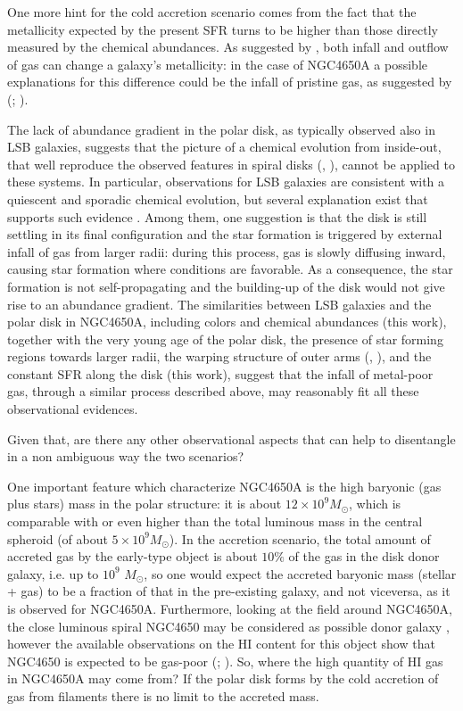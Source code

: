 \documentclass[12pt,preprint]{aastex}
\begin{document}
One more hint for the cold accretion scenario comes from the fact
that the metallicity expected by the present SFR turns to be
higher than those directly measured by the chemical abundances. As
suggested by \citet{Dal07}, both infall and outflow of gas can
change a galaxy's metallicity: in the case of NGC4650A a possible
explanations for this difference could be the infall of pristine
gas, as suggested by (\citealt{Fin07}; \citealt{Ell08}).

The lack of abundance gradient in the polar disk, as typically
observed also in LSB galaxies, suggests that the picture of a chemical
evolution from inside-out, that well reproduce the observed features
in spiral disks (\citealt{Mat89}, \citealt{Boi99}), cannot be applied
to these systems.  In particular, observations for LSB galaxies are
consistent with a quiescent and sporadic chemical evolution, but
several explanation exist that supports such evidence
\citep{deB98}. Among them, one suggestion is that the disk is still
settling in its final configuration and the star formation is
triggered by external infall of gas from larger radii: during this
process, gas is slowly diffusing inward, causing star formation where
conditions are favorable. As a consequence, the star formation is not
self-propagating and the building-up of the disk would not give rise
to an abundance gradient. The similarities between LSB galaxies and
the polar disk in NGC4650A, including colors \citep{Iod02} and
chemical abundances (this work), together with the very young age of
the polar disk, the presence of star forming regions towards larger
radii, the warping structure of outer arms (\citealt{Gal02},
\citealt{Iod02}), and the constant SFR along the disk (this work),
suggest that the infall of metal-poor gas, through a similar process
described above, may reasonably fit all these observational evidences.

Given that, are there any other observational
aspects that can help to disentangle in a non ambiguous way the
two scenarios?

One important feature which characterize NGC4650A is the high
baryonic (gas plus stars) mass in the polar structure: it is about
$12 \times 10^{9} M_\odot$, which is comparable with or even
higher than the total luminous mass in the central spheroid (of
about $5 \times 10^{9} M_\odot$). In the accretion scenario, the
total amount of accreted gas by the early-type object is about
$10\%$ of the gas in the disk donor galaxy, i.e. up to $10^{9}$
$M_{\odot}$, so one would expect the accreted baryonic mass
(stellar + gas) to be a fraction of that in the pre-existing
galaxy, and not viceversa, as it is observed for NGC4650A.
Furthermore, looking at the field around NGC4650A, the close
luminous spiral NGC4650 may be considered as possible donor galaxy
\citep{Bou03}, however the available observations on the HI
content for this object show that NGC4650 is expected to be
gas-poor (\citealt{Arn97}; \citealt{Van02}). So, where the high
quantity of HI gas in NGC4650A may come from? If the polar disk
forms by the cold accretion of gas from filaments there is no
limit to the accreted mass.
\end{document}
